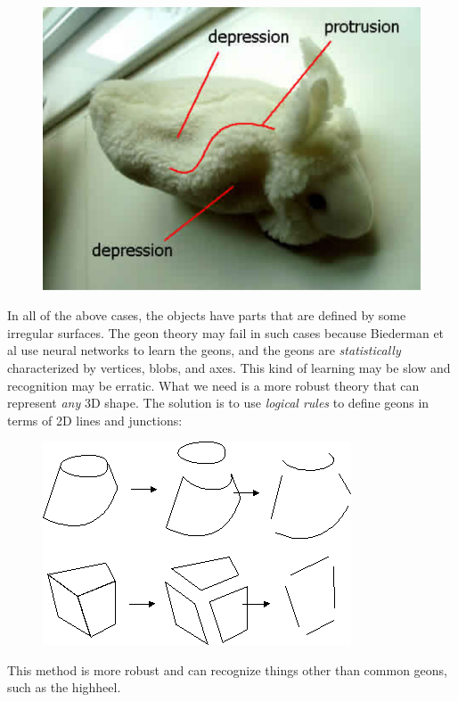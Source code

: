 \begin{figure}[H]
\centering
\includegraphics[scale=0.7]{RabitAnalysis.png}
\end{figure}

In all of the above cases, the objects have parts that are defined by some irregular surfaces. The geon theory may fail in such cases because Biederman et al use neural networks to learn the geons, and the geons are \emph{statistically} characterized by  vertices, blobs, and axes. This kind of learning may be slow and recognition may be erratic. What we need is a more robust theory that can represent \emph{any} 3D shape. The solution is to use \emph{logical rules} to define geons in terms of 2D lines and junctions:

\begin{figure}[H]
\centering
\includegraphics[scale=0.6]{PolygonDecomposition.PNG}
\end{figure}

This method is more robust and can recognize things other than common geons, such as the highheel.


